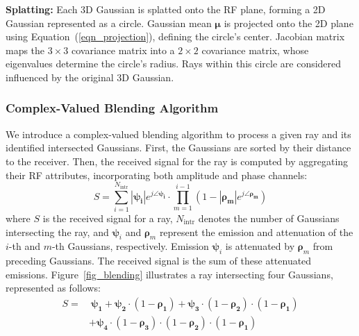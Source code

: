 \textbf{Splatting:}  
Each 3D Gaussian is splatted onto the RF plane, forming a 2D Gaussian represented as a circle.  
Gaussian mean \(\boldsymbol{\mu}\) is projected onto the 2D plane using Equation~(\ref{eqn_projection}), defining the circle's center.  
Jacobian matrix~\cite{takikawa2021neural} maps the \(3 \times 3\) covariance matrix into a \(2 \times 2\) covariance matrix, whose eigenvalues determine the circle's radius.  
Rays within this circle are considered influenced by the original 3D Gaussian.


\subsubsection{Complex-Valued Blending Algorithm}\label{sec_complex_blending}  
We introduce a complex-valued blending algorithm to process a given ray and its identified intersected Gaussians.  
First, the Gaussians are sorted by their distance to the receiver.  
Then, the received signal for the ray is computed by aggregating their RF attributes, incorporating both amplitude and phase channels:
\begin{equation}
\label{eqn_blending}
S = \sum_{i=1}^{N_{\text{intr}}}  \left|\boldsymbol{\psi_i}\right| e^{j \angle \boldsymbol{\psi_i}} \cdot \prod_{m=1}^{i-1} \left( 1 - \left|\boldsymbol{\rho_m}\right| e^{j \angle \boldsymbol{\rho_m}} \right)
\end{equation}
where \(S\) is the received signal for a ray, \(N_{\text{intr}}\) denotes the number of Gaussians intersecting the ray, and \(\boldsymbol{\psi}_i\) and \(\boldsymbol{\rho}_m\) represent the emission and attenuation of the \(i\)-th and \(m\)-th Gaussians, respectively.  
Emission \(\boldsymbol{\psi}_i\) is attenuated by \(\boldsymbol{\rho}_m\) from preceding Gaussians.
The received signal is the sum of these attenuated emissions.
Figure~\ref{fig_blending} illustrates a ray intersecting four Gaussians, represented as follows:
\begin{equation}
\begin{aligned}
S = & \ \boldsymbol{\psi_1} + 
\boldsymbol{\psi_2} \cdot (1 - \boldsymbol{\rho_1}) + \boldsymbol{\psi_3} \cdot (1 - \boldsymbol{\rho_2}) \cdot (1 - \boldsymbol{\rho_1}) \\
& + \boldsymbol{\psi_4} \cdot (1 - \boldsymbol{\rho_3}) \cdot (1 - \boldsymbol{\rho_2}) \cdot (1 - \boldsymbol{\rho_1})
\end{aligned}
\end{equation}


